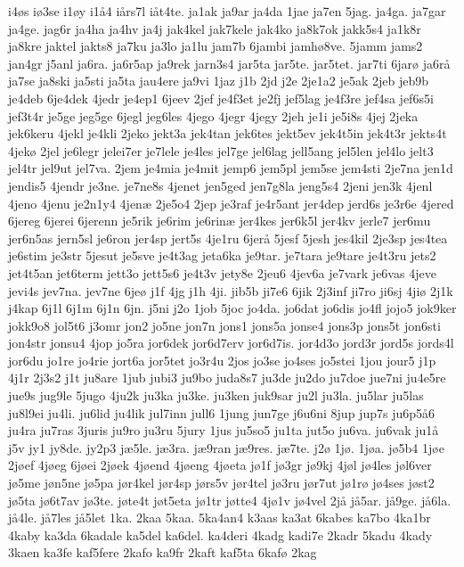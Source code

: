 {i4øs
iø3se
i1øy
i1å4
iårs7l
iåt4te.
ja1ak
ja9ar
ja4da
1jae
ja7en
5jag.
ja4ga.
ja7gar
ja4ge.
jag6r
ja4ha
ja4hv
ja4j
jak4kel
jak7kele
jak4ko
ja8k7ok
jakk5s4
ja1k8r
ja8kre
jaktel
jakts8
ja7ku
ja3lo
ja1lu
jam7b
6jambi
jamhø8ve.
5jamm
jams2
jan4gr
j5anl
ja6ra.
ja6r5ap
ja9rek
jarn3s4
jar5ta
jar5te.
jar5tet.
jar7ti
6jarø
ja6rå
ja7se
ja8ski
ja5sti
ja5ta
jau4ere
ja9vi
1jaz
j1b
2jd
j2e
2je1a2
je5ak
2jeb
jeb9b
je4deb
6je4dek
4jedr
je4ep1
6jeev
2jef
je4f3et
je2fj
jef5lag
je4f3re
jef4sa
jef6s5i
jef3t4r
je5ge
jeg5ge
6jegl
jeg6les
4jego
4jegr
4jegy
2jeh
je1i
je5i8s
4jej
2jeka
jek6keru
4jekl
je4kli
2jeko
jekt3a
jek4tan
jek6tes
jekt5ev
jek4t5in
jek4t3r
jekts4t
4jekø
2jel
je6legr
jelei7er
je7lele
je4les
jel7ge
jel6lag
jell5ang
jel5len
jel4lo
jelt3
jel4tr
jel9ut
jel7va.
2jem
je4mia
je4mit
jemp6
jem5pl
jem5se
jem4sti
2je7na
jen1d
jendis5
4jendr
je3ne.
je7ne8s
4jenet
jen5ged
jen7g8la
jeng5s4
2jeni
jen3k
4jenl
4jeno
4jenu
je2n1y4
4jenæ
2je5o4
2jep
je3raf
je4r5ant
jer4dep
jerd6s
je3r6e
4jered
6jereg
6jerei
6jerenn
je5rik
je6rim
je6rinæ
jer4kes
jer6k5l
jer4kv
jerle7
jer6mu
jer6n5as
jern5sl
je6ron
jer4sp
jert5s
4je1ru
6jerå
5jesf
5jesh
jes4kil
2je3sp
jes4tea
je6stim
je3str
5jesut
je5sve
je4t3ag
jeta6ka
je9tar.
je7tara
je9tare
je4t3ru
jets2
jet4t5an
jet6term
jett3o
jett5s6
je4t3v
jety8e
2jeu6
4jev6a
je7vark
je6vas
4jeve
jevi4s
jev7na.
jev7ne
6jeø
j1f
4jg
j1h
4ji.
jib5b
ji7e6
6jik
2j3inf
ji7ro
ji6sj
4jiø
2j1k
j4kap
6j1l
6j1m
6j1n
6jn.
j5ni
j2o
1job
5joc
jo4da.
jo6dat
jo6dis
jo4fl
jojo5
jok9ker
jokk9o8
jol5t6
j3omr
jon2
jo5ne
jon7n
jons1
jons5a
jonse4
jons3p
jons5t
jon6sti
jon4str
jonsu4
4jop
jo5ra
jor6dek
jor6d7erv
jor6d7is.
jor4d3o
jord3r
jord5s
jords4l
jor6du
jo1re
jo4rie
jort6a
jor5tet
jo3r4u
2jos
jo3se
jo4ses
jo5stei
1jou
jour5
j1p
4j1r
2j3s2
j1t
ju8are
1jub
jubi3
ju9bo
juda8s7
ju3de
ju2do
ju7doe
jue7ni
ju4e5re
jue9s
jug9le
5jugo
4ju2k
ju3ka
ju3ke.
ju3ken
juk9sar
ju2l
ju3la.
ju5lar
ju5las
ju8l9ei
ju4li.
ju6lid
ju4lik
jul7inn
jull6
1jung
jun7ge
j6u6ni
8jup
jup7s
ju6p5å6
ju4ra
ju7ras
3juris
ju9ro
ju3ru
5jury
1jus
ju5so5
ju1ta
jut5o
ju6va.
ju6vak
ju1å
j5v
jy1
jy8de.
jy2p3
jæ5le.
jæ3ra.
jæ9ran
jæ9res.
jæ7te.
j2ø
1jø.
1jøa.
jø5b4
1jøe
2jøef
4jøeg
6jøei
2jøek
4jøend
4jøeng
4jøeta
jø1f
jø3gr
jø9kj
4jøl
jø4les
jøl6ver
jø5me
jøn5ne
jø5pa
jør4kel
jør4sp
jørs5v
jør4tel
jø3ru
jør7ut
jø1rø
jø4ses
jøst2
jø5ta
jø6t7av
jø3te.
jøte4t
jøt5eta
jø1tr
jøtte4
4jø1v
jø4vel
2jå
jå5ar.
jå9ge.
jå6la.
jå4le.
jå7les
jå5let
1ka.
2kaa
5kaa.
5ka4an4
k3aas
ka3at
6kabes
ka7bo
4ka1br
4kaby
ka3da
6kadale
ka5del
ka6del.
ka4deri
4kadg
kadi7e
2kadr
5kadu
4kady
3kaen
ka3fe
kaf5fere
2kafo
ka9fr
2kaft
kaf5ta
6kafø
2kag
}
